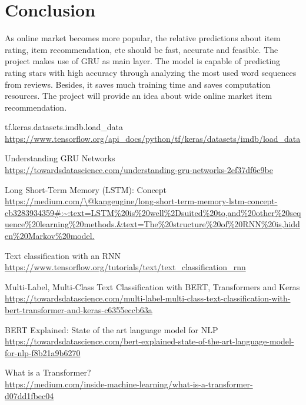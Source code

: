 \documentclass[12pt]{article}
\begin{document}
\section{Conclusion}
As online market becomes more popular, the relative predictions about item rating, item recommendation, etc 
should be fast, accurate and feasible. The project makes use of GRU as main layer. The model is capable of
predicting rating stars with high accuracy through analyzing the most used word sequences from reviews.
Besides, it saves much training time and saves computation resources. The project will provide an idea
about wide online market item recommendation.
\medskip
\begin{thebibliography}{12}
    
    tf.keras.datasets.imdb.load\_data
    \\\url{https://www.tensorflow.org/api\_docs/python/tf/keras/datasets/imdb/load\_data}

    Understanding GRU Networks
    \\\url{https://towardsdatascience.com/understanding-gru-networks-2ef37df6c9be}

    Long Short-Term Memory (LSTM): Concept
    \\\url{https://medium.com/\@kangeugine/long-short-term-memory-lstm-concept-cb3283934359\#:~:text=LSTM\%20is\%20well\%2Dsuited\%20to,and\%20other\%20sequence\%20learning\%20methods.\&text=The\%20structure\%20of\%20RNN\%20is,hidden\%20Markov\%20model.}
    
    Text classification with an RNN
    \\\url{https://www.tensorflow.org/tutorials/text/text\_classification\_rnn}

    Multi-Label, Multi-Class Text Classification with BERT, Transformers and Keras
    \\\url{https://towardsdatascience.com/multi-label-multi-class-text-classification-with-bert-transformer-and-keras-c6355eccb63a}

    BERT Explained: State of the art language model for NLP
    \\\url{https://towardsdatascience.com/bert-explained-state-of-the-art-language-model-for-nlp-f8b21a9b6270}

    What is a Transformer?
    \\\url{https://medium.com/inside-machine-learning/what-is-a-transformer-d07dd1fbec04}


\end{thebibliography}
\end{document}
